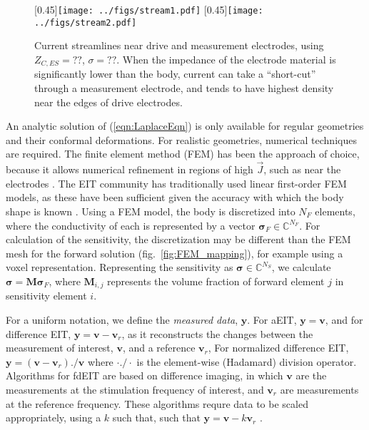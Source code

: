 \documentclass[12pt]{article} \usepackage[margin=3cm]{geometry} \usepackage[margin=20pt,font=small,labelfont=bf]{caption}\def\TBLWIDA{35mm}\def\TBLWIDB{95mm}
\newcommand\fref[1]{fig.\ \ref{#1}}
\newcommand{\yB}{\mathbf{y}}
\newcommand{\vB}{\mathbf{v}}
\newcommand{\MB}{\mathbf{M}}
\newcommand{\sG}{\bm{\sigma}}
\begin{document}
\begin{figure}
\centering
   [0.45\columnwidth]{\texttt{[image: ../figs/stream1.pdf]}}\hfil
   [0.45\columnwidth]{\texttt{[image: ../figs/stream2.pdf]}}\\
\caption{%
Current streamlines near drive and measurement electrodes, using
$Z_{C,ES} = ??$, $\sigma=??$. When the
impedance of the electrode material is significantly lower than the 
body, current can take a ``short-cut'' through a measurement electrode,
and tends to have highest density near the edges of drive electrodes.
}
\label{fig:electrode_currents}
\end{figure}


An analytic solution of (\ref{eqn:LaplaceEqn}) is only available for
regular geometries and their conformal deformations. For realistic
geometries, numerical techniques are required. The finite element
method (FEM) has been the approach of choice, because it allows
numerical refinement in regions of high $\vec{J}$, such as
near the electrodes \cite{Grychtol2013Refinement}. The EIT community
has traditionally used linear first-order FEM models, as these
have been sufficient given the accuracy with which
the body shape is known \cite{Grychtol2012Mismatch}.
Using a FEM model, the body is discretized into $N_F$ elements,
where the conductivity of each is represented by a vector
$\sG_F \in \mathbb{C}^{N_F}$.
For calculation of the sensitivity, the discretization may
be different than the FEM mesh for the forward solution (\fref{fig:FEM_mapping}),
 for example using a voxel representation.
Representing the sensitivity as $\sG \in \mathbb{C}^{N_S}$, 
we calculate $\sG = \MB \sG_F$, where $\MB_{i,j}$
represents the volume fraction of forward element $j$ in
sensitivity element $i$.

For a uniform notation, we define the {\em measured data}, $\yB$.
For aEIT, $\yB = \vB$, and for
difference EIT, $\yB= \vB - \vB_r$, as it reconstructs
the changes 
between the measurement of interest, $\vB$, and a reference $\vB_r$,
For normalized difference EIT, $\yB= (\vB - \vB_r) ./ \vB$
where $\cdot ./ \cdot$ is the element-wise (Hadamard) division operator.
Algorithms for fdEIT are based on difference imaging, in which
$\vB$ are the measurements at the stimulation frequency of
interest, and
$\vB_r$ are measurements at the reference frequency. 
These algorithms requre data to be scaled appropriately,
using a $k$ such that,
such that $\yB= \vB - k \vB_r$ \cite{Seo2008fdEIT}.
\end{document}
